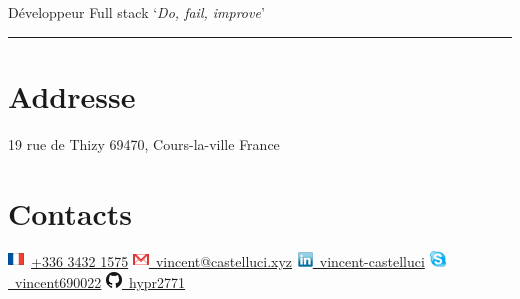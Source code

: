 \documentclass[]{friggeri-cv}
\begin{document}
      {Développeur Full stack}
\hfill \lq\textit{Do, fail, improve}\rq

\rule{397pt}{8pt}

\begin{aside}
  \section{Addresse}
  \hspace{1cm}
    19 rue de Thizy
    69470, Cours-la-ville
    France
  \section{Contacts}
  \hspace{1cm}
    \vspace{0.5mm}\includegraphics[scale=0.60]{img/france.png}~\href{tel:+33634321575}{+336 3432 1575}
    \vspace{0.5mm}\hspace{-2cm}\href{mailto:vincent.castelluci@gmail.com}{\includegraphics[scale=0.60]{img/mail.png}~vincent@castelluci.xyz}
    \vspace{0.5mm}\href{https://www.linkedin.com/in/vincent-castelluci-363939170}{\includegraphics[scale=0.60]{img/linkedin.png}~vincent-castelluci}
    \vspace{0.5mm}\href{skype://vincent690022?userinfo}{\includegraphics[scale=0.60]{img/skype.png}~vincent690022}
    \vspace{0.5mm}\href{https://github.com/hypr2771}{\includegraphics[scale=0.60]{img/github.png}~hypr2771}
    ~

\end{aside}
\end{document}

